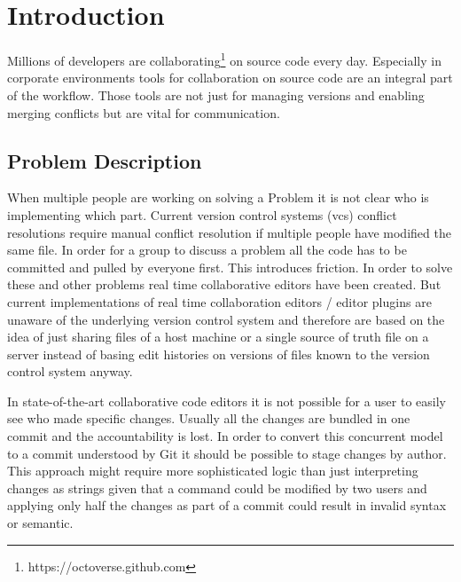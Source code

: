 \chapter{Introduction}
\label{sec:introduction}

Millions of developers are collaborating\footnote{https://octoverse.github.com} on source code every day.
Especially in corporate environments tools for collaboration on source code are an integral part of the workflow.
Those tools are not just for managing versions and enabling merging conflicts but are vital for communication.

\section{Problem Description}

When multiple people are working on solving a Problem it is not clear who is implementing which part. Current version control systems (vcs) conflict resolutions require manual conflict resolution if multiple people have modified the same file.
In order for a group to discuss a problem all the code has to be committed and pulled by everyone first. This introduces friction. In order to solve these and other problems real time collaborative editors have been created.
But current implementations of real time collaboration editors / editor plugins are unaware of the underlying version control system and therefore are based on the idea of just sharing files of a host machine or a single source of truth file on a server instead of basing edit histories on versions of files known to the version control system anyway.

In state-of-the-art collaborative code editors it is not possible for a user to easily see who made specific changes. Usually all the changes are bundled in one commit and the accountability is lost. In order to convert this concurrent model to a commit understood by Git it should be possible to stage changes by author. This approach might require more sophisticated logic than just interpreting changes as strings given that a command could be modified by two users and applying only half the changes as part of a commit could result in invalid syntax or semantic.

